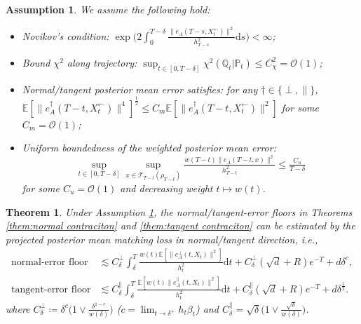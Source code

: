 \documentclass[11pt]{article}
\newcommand{\mb}{\mathbb}
\newcommand{\dee}{\mathrm{d}}
\newcommand{\mc}{\mathcal}
\newtheorem{theorem}{Theorem}[section]
\newtheorem{assumption}{Assumption}
\begin{document}
\begin{assumption}\label{assump:transfer} We assume the following hold:
\begin{itemize}
    \item [(0)] Novikov's condition: $\exp\big( 2\int_0^{T-\delta} \tfrac{\| e_A(T-s,X_t^\leftarrow) \|^2}{h_{T-s}^2} \dee s  \big)<\infty$; 
    \item [(1)] Bound $\chi^2$ along trajectory: $\sup_{t\in [0,T-\delta]} \chi^2(\mb{Q}_t|\mb{P}_t) \le C_{\chi}^2 =\mc{O}(1) $;
    \item [(2)] Normal/tangent posterior mean error satisfies: for any $\dagger\in \{\perp,\parallel\}$, $\mb{E}[\| e_A^\dagger(T-t,X_t^\leftarrow)\|^4]^{\frac{1}{2}}\le C_m \mb{E}[\| e_A^\dagger(T-t,X_t^\leftarrow)\|^2]$ for some $C_m=\mc{O}(1)$;
    \item [(3)] Uniform boundedness of the weighted posterior mean error: $$\sup_{t\in [0,T-\delta]}\sup_{x\in \mc{T}_{T-t}(\rho_{T-t})}\tfrac{w(T-t)\| e_A(T-t,x) \|^2}{h_{T-t}^2}\le \tfrac{C_u}{T-\delta}$$ for some $C_u=\mc{O}(1)$ and decreasing weight $t\mapsto w(t)$. 
\end{itemize}
\end{assumption}
\begin{theorem}\label{thm:inference to training} Under Assumption \ref{assump:transfer}, the normal/tangent-error floors in Theorems \ref{them:normal contraciton} and \ref{them:tangent contraciton} can be estimated by the projected posterior mean matching loss in normal/tangent direction, i.e., 
\begin{align}
    \text{normal-error floor} &\lesssim C_\delta^\perp\int_{\delta}^T \frac{w(t)\mb{E}[\| e_A^\perp(t,X_t)\|^2]}{h_{t}^2}\dee t + C_\delta^\perp(\sqrt{d}+R) e^{-T} +d\delta^{c}, \label{eq:normal error from training}\\
    \text{tangent-error floor} &\lesssim C_\delta^\parallel\int_{\delta}^T \frac{\mb{E}[w(t)\| e_A^\parallel(t,X_t)\|^2]}{h_{t}^2}\dee t + C_\delta^\parallel(\sqrt{d}+R) e^{-T}+d\delta^{\frac{1}{2}}. \label{eq:tangent error from training}
\end{align}   
where $C_\delta^\perp
\coloneqq \delta^c  \big(1 \vee \frac{\delta^{1-c}}{w(\delta)}\big)$ ($c=\lim_{t\to \delta^+} h_t\beta_t$) and $C_\delta^\parallel=\sqrt{\delta}  \big(1 \vee \frac{\sqrt{\delta}}{w(\delta)}\big) $.
\end{theorem}
\end{document}

